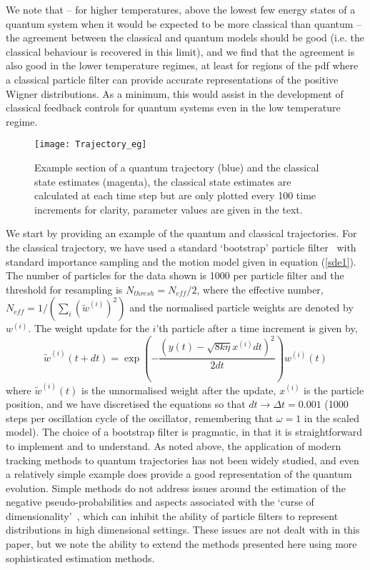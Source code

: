 \documentclass[conference]{IEEEtran}
\begin{document}
We note that -- for higher temperatures, above the lowest few energy states of a quantum system when it would be expected to be more classical than quantum -- the agreement between the classical and quantum models should be good (i.e. the classical behaviour is recovered in this limit), and we find that the agreement is also good in the lower temperature regimes, at least for regions of the pdf where a classical particle filter can provide accurate representations of the positive Wigner distributions. As a minimum, this would assist in the development of classical feedback controls for quantum systems even in the low temperature regime.

\begin{figure}[htbp]
       \centering
		\texttt{[image: Trajectory\_eg]} 
			\caption{\label{trajectory} Example section of a quantum trajectory (blue) and the classical state estimates (magenta), the classical state estimates are calculated at each time step but are only plotted every 100 time increments for clarity, parameter values are given in the text.}
\end{figure}
We start by providing an example of the quantum and classical trajectories. For the classical trajectory, we have used a standard `bootstrap' particle filter~\cite{Gor1993,Dou2001,Aru2002} with standard importance sampling and the motion model given in equation (\ref{sde1}). The number of particles for the data shown is 1000 per particle filter and the threshold for resampling is $N_{thresh} = N_{eff}/2$, where the effective number, $N_{eff} = 1/(\sum_i (\tilde{w}^{(i)})^2)$ and the normalised particle weights are denoted by $w^{(i)}$. The weight update for the $i$'th particle after a time increment is given by,
\begin{equation}
\tilde{w}^{(i)}(t+dt) = \exp\left( -\frac{(y(t) - \sqrt{8k\eta} x^{(i)}dt)^2}{2 dt} \right)w^{(i)}(t)
\end{equation}
where $\tilde{w}^{(i)}(t)$ is the unnormalised weight after the update, $x^{(i)}$ is the particle position, and we have discretised the equations so that $dt \rightarrow \Delta t = 0.001$ (1000 steps per oscillation cycle of the oscillator, remembering that $\omega = 1$ in the scaled model). The choice of a bootstrap filter is pragmatic, in that it is straightforward to implement and to understand. As noted above, the application of modern tracking methods to quantum trajectories has not been widely studied, and even a relatively simple example does provide a good representation of the quantum evolution. Simple methods do not address issues around the estimation of the negative pseudo-probabilities and aspects associated with the `curse of dimensionality'~\cite{Dau2005,Sur2019}, which can inhibit the ability of particle filters to represent distributions in high dimensional settings. These issues are not dealt with in this paper, but we note the ability to extend the methods presented here using more sophisticated estimation methods.
\end{document}
